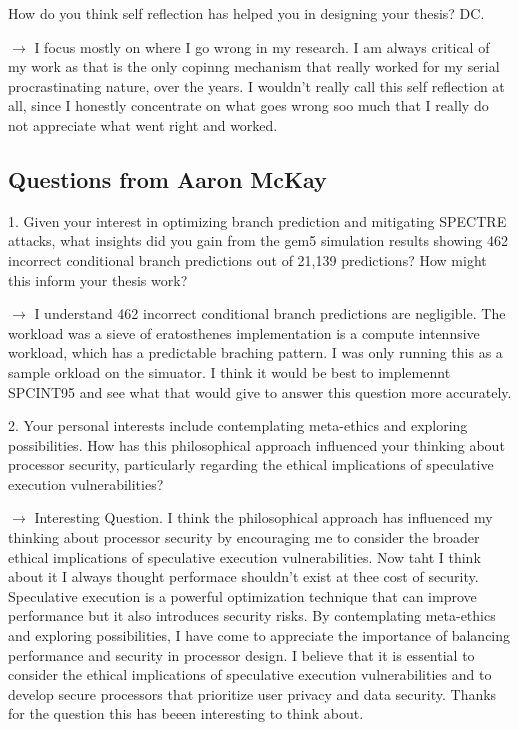How do you think self reflection has helped you in designing your thesis? DC.\@

$\longrightarrow$ I focus mostly on where I go wrong in my research. I am always critical of my work as that is the only copinng mechanism that really worked for my serial procrastinating nature, over the years. I wouldn't really call this self reflection at all, since I honestly concentrate on what goes wrong soo much that I really do not appreciate what went right and worked. 
\subsection{Questions from Aaron McKay}
1. Given your interest in optimizing branch prediction and mitigating SPECTRE attacks, what insights did you gain from the gem5 simulation results showing 462 incorrect conditional branch predictions out of 21,139 predictions? How might this inform your thesis work?

$\longrightarrow$ I understand 462 incorrect conditional branch predictions are negligible. The workload was a sieve of eratosthenes implementation is a compute intennsive workload, which has a predictable braching pattern. I was only running this as a sample orkload on the simuator. I think it would be best to implemennt SPCINT95 and see what that would give to answer this question more accurately.

2. Your personal interests include contemplating meta-ethics and exploring possibilities. How has this philosophical approach influenced your thinking about processor security, particularly regarding the ethical implications of speculative execution vulnerabilities?

$\longrightarrow$ Interesting Question. I think the philosophical approach has influenced my thinking about processor security by encouraging me to consider the broader ethical implications of speculative execution vulnerabilities. Now taht I think about it I always thought performace shouldn't exist at thee cost of security.
Speculative execution is a powerful optimization technique that can improve performance but it also introduces security risks. By contemplating meta-ethics and exploring possibilities, I have come to appreciate the importance of balancing performance and security in processor design. I believe that it is essential to consider the ethical implications of speculative execution vulnerabilities and to develop secure processors that prioritize user privacy and data security.
Thanks for the question this has beeen interesting to think about. 

